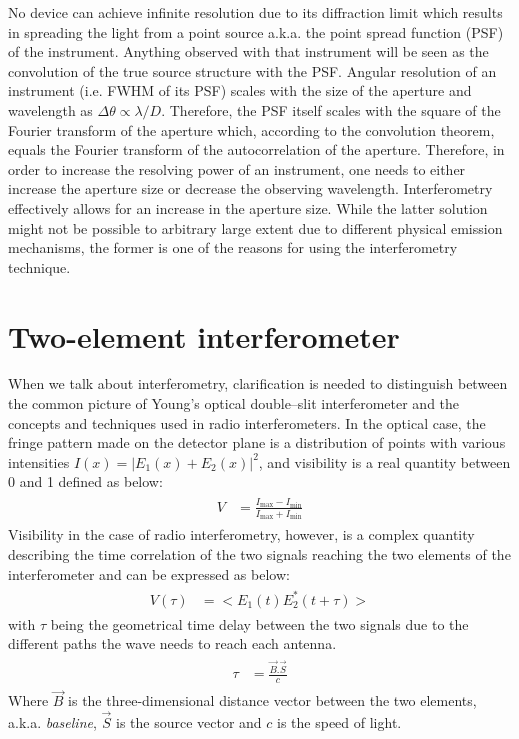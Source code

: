 \documentclass[a4wide,12pt]{book}
\begin{document}
No device can achieve infinite resolution due to its diffraction limit which results in spreading the light from a point source a.k.a. the point spread function (PSF) of the instrument. Anything observed with that instrument will be seen as the convolution of the true source structure with the PSF. Angular resolution of an instrument (i.e. FWHM of its PSF) scales with the size of the aperture and wavelength as $\Delta\theta \propto \lambda / D$. Therefore, the PSF itself scales with the square of the Fourier transform of the aperture which, according to the convolution theorem, equals the Fourier transform of the autocorrelation of the aperture. Therefore, in order to increase the resolving power of an instrument, one needs to either increase the aperture size or decrease the observing wavelength.  Interferometry effectively allows for an increase in the aperture size. While the latter solution might not be possible to arbitrary large extent due to different physical emission mechanisms, the former is one of the reasons for using the interferometry technique.
 
\section{Two-element interferometer}
When we talk about interferometry, clarification is needed to distinguish between the common picture of Young's optical double--slit interferometer and the concepts and techniques used in radio interferometers. In the optical case, the fringe pattern made on the detector plane is a distribution of points with various intensities $I(x) = |E_1(x) + E_2(x)|^2$, and visibility is a real quantity between 0 and 1 defined as below:
\begin{align} 
\begin{split}
V &= \frac{I_\mathrm{max} - I_\mathrm{min}}{I_\mathrm{max} + I_\mathrm{min}}
\end{split}                    
\end{align}
Visibility in the case of radio interferometry, however, is a complex quantity describing the time correlation of the two signals reaching the two elements of the interferometer and can be expressed as below:
\begin{align} 
\begin{split}
\label{eq:vis_def}
V(\tau) &= <E_1(t)E_2^*(t+\tau)>
\end{split}                    
\end{align}
with $\tau$ being the geometrical time delay between the two signals due to the different paths the wave needs to reach each antenna.
\begin{align} 
\begin{split}
\tau &= \frac{\vec{B}.\vec{S}}{c}
\end{split}                    
\end{align}
Where $\vec{B}$ is the three-dimensional distance vector between the two elements, a.k.a. \emph{baseline}, $\vec{S}$ is the source vector and $c$ is the speed of light.
\end{document}
